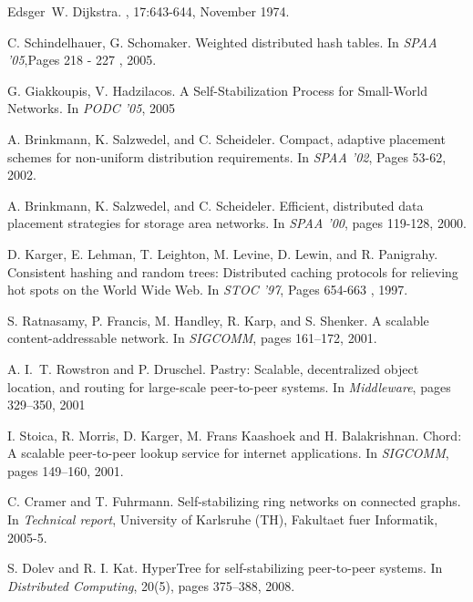 \documentclass[11pt]{article}
\begin{document}
\newpage\begin{thebibliography}{10}



Edsger~W. Dijkstra.
, 17:643-644, November 1974.

C. Schindelhauer, G. Schomaker.
\newblock Weighted distributed hash tables.
\newblock In {\em SPAA '05},Pages 218 - 227 , 2005.

G. Giakkoupis, V. Hadzilacos.
\newblock A Self-Stabilization Process for Small-World Networks.
\newblock In {\em PODC '05}, 2005

A. Brinkmann, K. Salzwedel, and C. Scheideler.
\newblock Compact, adaptive placement schemes for
non-uniform distribution requirements.
\newblock In {\em SPAA '02}, Pages 53-62, 2002.

A. Brinkmann, K. Salzwedel, and C. Scheideler.
\newblock Efficient, distributed data placement strategies for
storage area networks.
\newblock In {\em SPAA '00}, pages 119-128, 2000.

D. Karger, E. Lehman, T. Leighton, M. Levine, D. Lewin, and R. Panigrahy.
\newblock Consistent hashing and
random trees: Distributed caching protocols for
relieving hot spots on the World Wide Web.
\newblock In {\em STOC '97}, Pages 654-663 , 1997.

S. Ratnasamy, P. Francis, M. Handley, R. Karp, and S. Shenker.
\newblock A scalable content-addressable network.
\newblock In {\em SIGCOMM}, pages 161--172, 2001.

A. I.~T. Rowstron and P. Druschel.
\newblock Pastry: Scalable, decentralized object location, and routing for
  large-scale peer-to-peer systems.
\newblock In {\em Middleware}, pages 329--350, 2001


I. Stoica, R. Morris, D. Karger, M. Frans Kaashoek and H. Balakrishnan.
\newblock Chord: A scalable peer-to-peer lookup service for internet
  applications.
\newblock In {\em SIGCOMM}, pages 149--160, 2001.



C. Cramer and T. Fuhrmann.
\newblock Self-stabilizing ring networks on connected graphs.
\newblock In {\em Technical report}, University of Karlsruhe (TH),  Fakultaet fuer Informatik, 2005-5.


S. Dolev and R. I. Kat.
\newblock HyperTree for self-stabilizing peer-to-peer systems.
\newblock In {\em Distributed Computing}, 20(5), pages 375--388, 2008.



\end{thebibliography}
\end{document}
